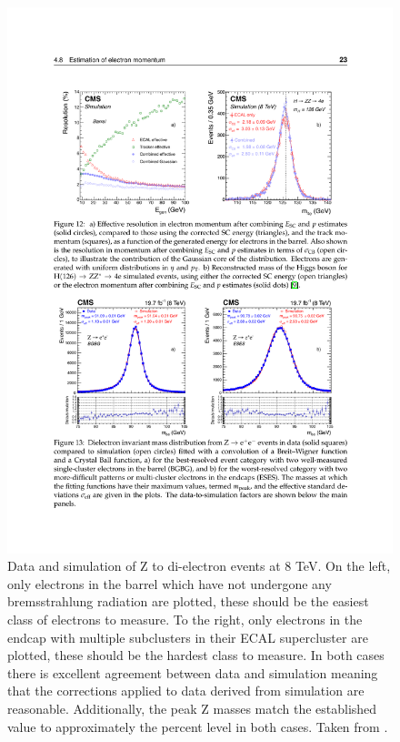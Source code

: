     \begin{figure}[h!]
      \centering
      \includegraphics[width=.9\textwidth]{figures/electron_Z_resolution.pdf}
      \caption[Data and simulation of Z to di-electron events at 8 TeV.]{Data and simulation of Z to di-electron events at 8 TeV. On the left, only electrons in the barrel which have not undergone any bremsstrahlung radiation are plotted, these should be the easiest class of electrons to measure. To the right, only electrons in the endcap with multiple subclusters in their ECAL supercluster are plotted, these should be the hardest class to measure. In both cases there is excellent agreement between data and simulation meaning that the corrections applied to data derived from simulation are reasonable. Additionally, the peak Z masses match the established value to approximately the percent level in both cases. Taken from \cite{Electron_reco}.}
      \label{fig:electron_Z_resolution}
    \end{figure}

